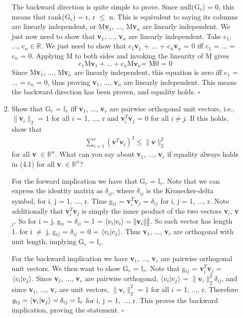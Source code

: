 \documentclass[12pt]{article}
\newcommand{\hop}{\vspace{1mm}}
\newcommand{\jump}{\vspace{5mm}}
\newcommand{\R}{\mathbb{R}}
\begin{document}
\begin{enumerate}[leftmargin=\labelsep]
\begin{enumerate}
    \hop
    The backward direction is quite simple to prove. Since null(G$_r$) = 0, this means that rank(G$_r$) = r, r $\leq$ n. This is equivalent to saying its columns are linearly independent, or M\textbf{v}$_1$, ..., M\textbf{v}$_n$ are linearly independent. We just now need to show that \textbf{v}$_1$, ..., \textbf{v}$_n$ are linearly independent. Take c$_1$, ..., c$_n \in \R$. We just need to show that c$_1$\textbf{v}$_1$ + ... + c$_n$\textbf{v}$_n$ = 0 iff c$_1$ = ... = c$_n$ = 0. Applying M to both sides and invoking the linearity of M gives
    \[
    \text{c$_1$M}\textbf{v}_1 + ... + \text{c$_n$M}\textbf{v}_n \text{= M0 = 0}
    \]
    Since M\textbf{v}$_1$, ..., M\textbf{v}$_n$ are linearly independent, this equation is zero iff c$_1$ = ... = c$_n$ = 0, thus proving \textbf{v}$_1$, ..., \textbf{v}$_n$ are linearly independent. This means the backward direction has been proven, and equality holds. $\square$

    \hop
    \item Show that G$_r$ = $\mathbb{I}_r$ iff \textbf{v}$_1$, ..., \textbf{v}$_r$ are pairwise orthogonal unit vectors, i.e., $\lVert$\textbf{v}$_i$$\rVert_2$ = 1 for all $i$ = 1, ..., r and \textbf{v}$^T_i$\textbf{v}$_j$ = 0 for all $i \neq j$. If this holds, show that
\begin{align}
    \sum_{i = 1}^r(\textbf{v}^T\textbf{v}_i)^2 \leq \lVert \textbf{v} \rVert_2^2 \tag{4.1} 
\end{align}
for all \textbf{v} $\in \R^n$. What can you say about \textbf{v}$_1$, ..., \textbf{v}$_r$ if equality always holds in (4.1) for all \textbf{v} $\in \R^n$? 

\jump
For the forward implication we have that G$_r$ = $\mathbb{I}_r$. Note that we can express the identity matrix as $\delta_{ij}$, where $\delta_{ij}$ is the Kronecker-delta symbol, for i, j = 1, ..., r. Thus g$_{ij}$ = \textbf{v}$_i^T$\textbf{v}$_j$ = $\delta_{ij}$ for i, j = 1, ..., r. Note additionally that \textbf{v}$_i^T$\textbf{v}$_j$ is simply the inner product of the two vectors \textbf{v}$_i$, \textbf{v}$_j$. So for i = j, g$_{ii}$ = $\delta_{ii}$ = 1 =  $\braket{v_i | v_i} = \lVert \textbf{v}_i \rVert_2^2$. So each vector has length 1. for i $\neq$ j, g$_{ij}$ = $\delta_{ij}$ = 0 =  $\braket{v_i | v_j}$. Thus \textbf{v}$_1$, ..., \textbf{v}$_r$ are orthogonal with unit length, implying G$_r$ = $\mathbb{I}_r$.

\hop
For the backward implication we have \textbf{v}$_1$, ..., \textbf{v}$_r$ are pairwise orthogonal unit vectors. We then want to show G$_r$ = $\mathbb{I}_r$. Note that g$_{ij}$ = \textbf{v}$_i^T$\textbf{v}$_j$ = $\braket{v_i | v_j}$. Since \textbf{v}$_1$, ..., \textbf{v}$_r$ are pairwise orthogonal, $\braket{v_i | v_j}$ = $\lVert \textbf{v}_i \rVert _2^2\delta_{ij}$, and since \textbf{v}$_1$, ..., \textbf{v}$_r$ are unit vectors, $\lVert \textbf{v}_i \rVert _2^2$ = 1 for all $i$ = 1, ..., r. Therefore $g_{ij} = \braket{\textbf{v}_i | \textbf{v}_j} = \delta_{ij} = \mathbb{I}_r$ for i, j = 1, ..., r.
This proves the backward implication, proving the statement. $\square$


\end{enumerate}
\end{enumerate}
\end{document}

